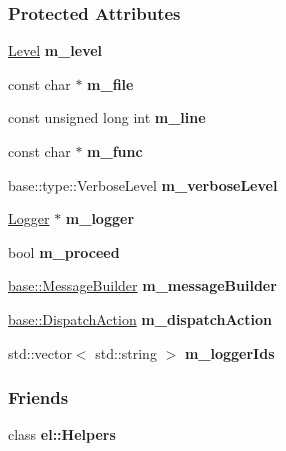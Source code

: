 \subsubsection*{Protected Attributes}
\begin{DoxyCompactItemize}
\item 
\hypertarget{a00097_a28522bf9b05b4edcc0baf5196645d317}{}\hyperlink{a00183_ab0ac6091262344c52dd2d3ad099e8e36}{Level} {\bfseries m\+\_\+level}\label{a00097_a28522bf9b05b4edcc0baf5196645d317}

\item 
\hypertarget{a00097_a1eada1175721ba11b4eb6c9515d8e2dc}{}const char $\ast$ {\bfseries m\+\_\+file}\label{a00097_a1eada1175721ba11b4eb6c9515d8e2dc}

\item 
\hypertarget{a00097_ac71f81d43f58b80ea31ae248e9fe6a23}{}const unsigned long int {\bfseries m\+\_\+line}\label{a00097_ac71f81d43f58b80ea31ae248e9fe6a23}

\item 
\hypertarget{a00097_a57291e0751fe93547d9d5551fb3e8415}{}const char $\ast$ {\bfseries m\+\_\+func}\label{a00097_a57291e0751fe93547d9d5551fb3e8415}

\item 
\hypertarget{a00097_a335803052b6878c058a4a888279df04d}{}base\+::type\+::\+Verbose\+Level {\bfseries m\+\_\+verbose\+Level}\label{a00097_a335803052b6878c058a4a888279df04d}

\item 
\hypertarget{a00097_a0fab2e9a168b7973bcca4574d05490d2}{}\hyperlink{a00048}{Logger} $\ast$ {\bfseries m\+\_\+logger}\label{a00097_a0fab2e9a168b7973bcca4574d05490d2}

\item 
\hypertarget{a00097_a238593eda90cf32645c4541e738bea9a}{}bool {\bfseries m\+\_\+proceed}\label{a00097_a238593eda90cf32645c4541e738bea9a}

\item 
\hypertarget{a00097_a63763a047d595271cb14f9a80430306b}{}\hyperlink{a00052}{base\+::\+Message\+Builder} {\bfseries m\+\_\+message\+Builder}\label{a00097_a63763a047d595271cb14f9a80430306b}

\item 
\hypertarget{a00097_acbea5b77953cf6e39baab015e83a4100}{}\hyperlink{a00184_a3aa2563d38e47388ba242a1694fc2839}{base\+::\+Dispatch\+Action} {\bfseries m\+\_\+dispatch\+Action}\label{a00097_acbea5b77953cf6e39baab015e83a4100}

\item 
\hypertarget{a00097_a9137860437510e1a26e8b0c1814c7ae7}{}std\+::vector$<$ std\+::string $>$ {\bfseries m\+\_\+logger\+Ids}\label{a00097_a9137860437510e1a26e8b0c1814c7ae7}

\end{DoxyCompactItemize}
\subsubsection*{Friends}
\begin{DoxyCompactItemize}
\item 
\hypertarget{a00097_a2fb8a2c02cbf86247f093c118bed877a}{}class {\bfseries el\+::\+Helpers}\label{a00097_a2fb8a2c02cbf86247f093c118bed877a}

\end{DoxyCompactItemize}
